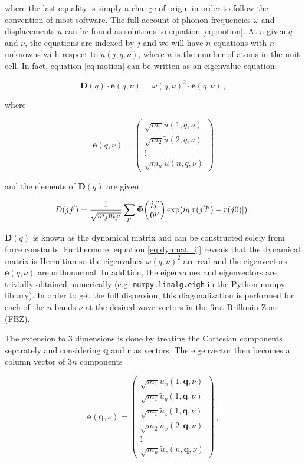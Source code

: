 \noindent where the last equality is simply a change of origin in order to follow the convention of most software. The full account of phonon frequencies $\omega$ and displacements $\tilde{u}$ can be found as solutions to equation \eqref{eq:motion}. At a given $q$ and $\nu$, the equations are indexed by $j$ and we will have $n$ equations with $n$ unknowns with respect to $\tilde{u}(j,q,\nu)$, where $n$ is the number of atoms in the unit cell. In fact, equation \eqref{eq:motion} can be written as an eigenvalue equation:

\begin{equation}
\bm{D}(q) \cdot \bm{e}(q,\nu) = \omega(q,\nu)^2 \cdot \bm{e}(q,\nu) \, , \label{eq:dynmat}
\end{equation}

\noindent where 

\[ \bm{e}(q,\nu) = \begin{pmatrix}
\sqrt{m_1}\tilde{u}(1,q,\nu) \\
\sqrt{m_2}\tilde{u}(2,q,\nu) \\
\vdots \\
\sqrt{m_n}\tilde{u}(n,q,\nu)
\end{pmatrix} \]

\noindent and the elements of $\bm{D}(q)$ are given 

\begin{equation}
D(j\jp) = \frac{1}{\sqrt{m_j m_{\jp}}} \sum_{\lp} \fczero \exp (iq[r(\jp\lp) - r(j0)]) \, . \label{eq:dynmat_ij}
\end{equation}

\noindent $\bm{D}(q)$ is known as the dynamical matrix and can be constructed solely from force constants. Furthermore, equation \eqref{eq:dynmat_ij} reveals that the dynamical matrix is Hermitian so the eigenvalues $\omega(q,\nu)^2$ are real and the eigenvectors $\bm{e}(q, \nu)$ are orthonormal. In addition, the eigenvalues and eigenvectors are trivially obtained numerically (e.g. \texttt{numpy.linalg.eigh} in the Python numpy library). In order to get the full dispersion, this diagonalization is performed for each of the $n$ bands $\nu$ at the desired wave vectors in the first Brillouin Zone (FBZ). 

The extension to 3 dimensions is done by treating the Cartesian components separately and considering $\bm{q}$ and $\bm{r}$ as vectors. The eigenvector then becomes a column vector of $3n$ components 

\[ \bm{e}(\bm{q},\nu) = \begin{pmatrix}
\sqrt{m_1}\tilde{u}_x(1,\bm{q},\nu) \\
\sqrt{m_1}\tilde{u}_y(1,\bm{q},\nu) \\
\sqrt{m_1}\tilde{u}_z(1,\bm{q},\nu) \\
\sqrt{m_2}\tilde{u}_x(2,\bm{q},\nu) \\
\vdots \\
\sqrt{m_{n}}\tilde{u}_z(n,\bm{q},\nu)
\end{pmatrix} \, , \]

